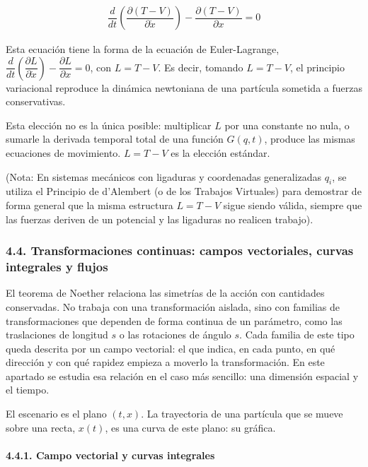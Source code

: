 \documentclass[
  spanish,
]{article}
\begin{document}
\[
\begin{aligned}
\dfrac{d}{dt}\left( \dfrac{\partial (T - V)}{\partial \dot{x}} \right) - \dfrac{\partial (T - V)}{\partial x} = 0
\end{aligned}
\]

Esta ecuación tiene la forma de la ecuación de Euler-Lagrange,
\(\dfrac{d}{dt}\left( \dfrac{\partial L}{\partial \dot{x}} \right) - \dfrac{\partial L}{\partial x} = 0\),
con \(L = T - V\). Es decir, tomando \(L = T - V\), el principio
variacional reproduce la dinámica newtoniana de una partícula sometida a
fuerzas conservativas.

Esta elección no es la única posible: multiplicar \(L\) por una
constante no nula, o sumarle la derivada temporal total de una función
\(G(q,t)\), produce las mismas ecuaciones de movimiento. \(L = T - V\)
es la elección estándar.

(Nota: En sistemas mecánicos con ligaduras y coordenadas generalizadas
\(q_i\), se utiliza el Principio de d'Alembert (o de los Trabajos
Virtuales) para demostrar de forma general que la misma estructura
\(L = T - V\) sigue siendo válida, siempre que las fuerzas deriven de un
potencial y las ligaduras no realicen trabajo).

\subsubsection{4.4. Transformaciones continuas: campos vectoriales,
curvas integrales y
flujos}\label{transformaciones-continuas-campos-vectoriales-curvas-integrales-y-flujos}

El teorema de Noether relaciona las simetrías de la acción con
cantidades conservadas. No trabaja con una transformación aislada, sino
con familias de transformaciones que dependen de forma continua de un
parámetro, como las traslaciones de longitud \(s\) o las rotaciones de
ángulo \(s\). Cada familia de este tipo queda descrita por un campo
vectorial: el que indica, en cada punto, en qué dirección y con qué
rapidez empieza a moverlo la transformación. En este apartado se estudia
esa relación en el caso más sencillo: una dimensión espacial y el
tiempo.

El escenario es el plano \((t, x)\). La trayectoria de una partícula que
se mueve sobre una recta, \(x(t)\), es una curva de este plano: su
gráfica.

\paragraph{4.4.1. Campo vectorial y curvas
integrales}\label{campo-vectorial-y-curvas-integrales}
\end{document}
